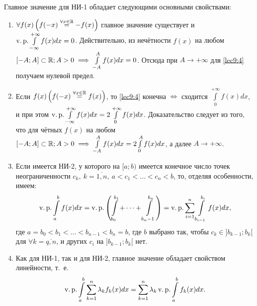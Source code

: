 \documentclass[../../main.tex]{subfiles}
\begin{document}
Главное значение для НИ-1 обладает следующими основными свойствами:
\begin{enumerate}[label=\arabic*$^{\circ}$.]
\item
$ \forall f(x) \left(f(-x) \stackrel{\forall x \in \mathbb{R}}{=} -f(x) \right) $
главное значение существует и $\operatorname{v.p.}\int\limits_{-\infty}^{+\infty}f(x)dx=0$.
Действительно, из нечётности $ f(x) $ на любом $ [-A; A] \subset \mathbb{R}; A > 0 
\implies \int\limits_{-A}^A f(x) dx = 0$. Отсюда при $ A \to +\infty $ для
\eqref{lec9:4} получаем нулевой предел.
\item
Если $ f(x) \left(f(-x) \stackrel{\forall x \in \mathbb{R}}{=} f(x) \right) $, то
\eqref{lec9:4} конечна $ \iff $ сходится $ \int\limits_0^{+\infty}f(x)dx $, и 
при этом $ \operatorname{v.p.} \int\limits_{-\infty}^{+\infty} f(x) dx = 
2\int\limits_0^{+\infty} f(x) dx$. Доказательство следует из того, что для
чётных $ f(x) $ на любом $ [-A; A] \subset \mathbb{R}; A > 0 
\implies \int\limits_{-A}^A f(x) dx = 2\int\limits_0^A f(x) dx$, а далее 
$ A \to +\infty $.
\item
Если имеется НИ-2, у которого на $ [a; b) $ имеется конечное число точек
неограниченности $ c_k,\ k = \overline{1,n},\ a < c_1 < \dots <
c_n < b $, то, отделяя особенности, имеем: \[\operatorname{v.p.} \int\limits_a^b f(x) dx = 
\operatorname{v.p.} \left(\int\limits_{b_0}^{b_1} + \dots + \int\limits_{b_n - 1}^{b_n}
\right) = \operatorname{v.p.} \sum\limits_{i = 1}^n \int\limits_{b_{i - 1}}^{b_i} f(x)dx, \]
где $ a = b_0 < b_1 < \dots < b_{n - 1} < b_n = b $, где $ b $ выбрано так, 
чтобы $ c_k \in ]b_{k - 1}; b_k[ $ для $\forall k = \overline{q, n}$, и других
$ c_i $ на $ ]b_{k - 1}; b_k[ $ нет.
\item
Как для НИ-1, так и для НИ-2, главное значение обладает свойством линейности,
т.~е. \[\operatorname{v.p.} \int\limits_a^b \sum\limits_{k = 1}^n \lambda_kf_k(x)dx =
\sum\limits_{k = 1}^n \lambda_k \operatorname{v.p.} \int\limits_a^b f_k(x)dx.\]
\end{enumerate}
\end{document}
